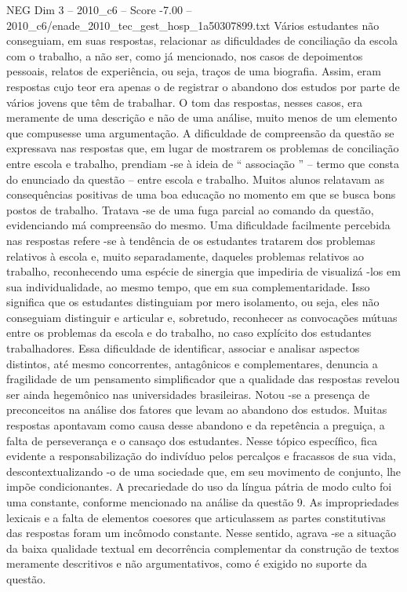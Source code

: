 \begin{textsample}{NEG Dim 3 – 2010\_c6 – Score -7.00 – 2010\_c6/enade\_2010\_tec\_gest\_hosp\_1a50307899.txt}
Vários estudantes não conseguiam, em suas respostas, relacionar as dificuldades de conciliação da escola com o trabalho, a não ser, como já mencionado, nos casos de depoimentos pessoais, relatos de experiência, ou seja, traços de uma biografia.
Assim, eram respostas cujo teor era apenas o de registrar o abandono dos estudos por parte de vários jovens que têm de trabalhar.
O tom das respostas, nesses casos, era meramente de uma descrição e não de uma análise, muito menos de um elemento que compusesse uma argumentação.
A dificuldade de compreensão da questão se expressava nas respostas que, em lugar de mostrarem os problemas de conciliação entre escola e trabalho, prendiam -se à ideia de “ associação ” – termo que consta do enunciado da questão – entre escola e trabalho.
Muitos alunos relatavam as consequências positivas de uma boa educação no momento em que se busca bons postos de trabalho.
Tratava -se de uma fuga parcial ao comando da questão, evidenciando má compreensão do mesmo.
Uma dificuldade facilmente percebida nas respostas refere -se à tendência de os estudantes tratarem dos problemas relativos à escola e, muito separadamente, daqueles problemas relativos ao trabalho, reconhecendo uma espécie de sinergia que impediria de visualizá -los em sua individualidade, ao mesmo tempo, que em sua complementaridade.
Isso significa que os estudantes distinguiam por mero isolamento, ou seja, eles não conseguiam distinguir e articular e, sobretudo, reconhecer as convocações mútuas entre os problemas da escola e do trabalho, no caso explícito dos estudantes trabalhadores.
Essa dificuldade de identificar, associar e analisar aspectos distintos, até mesmo concorrentes, antagônicos e complementares, denuncia a fragilidade de um pensamento simplificador que a qualidade das respostas revelou ser ainda hegemônico nas universidades brasileiras.
Notou -se a presença de preconceitos na análise dos fatores que levam ao abandono dos estudos.
Muitas respostas apontavam como causa desse abandono e da repetência a preguiça, a falta de perseverança e o cansaço dos estudantes.
Nesse tópico específico, fica evidente a responsabilização do indivíduo pelos percalços e fracassos de sua vida, descontextualizando -o de uma sociedade que, em seu movimento de conjunto, lhe impõe condicionantes.
A precariedade do uso da língua pátria de modo culto foi uma constante, conforme mencionado na análise da questão 9.
As impropriedades lexicais e a falta de elementos coesores que articulassem as partes constitutivas das respostas foram um incômodo constante.
Nesse sentido, agrava -se a situação da baixa qualidade textual em decorrência complementar da construção de textos meramente descritivos e não argumentativos, como é exigido no suporte da questão.

\end{textsample}
